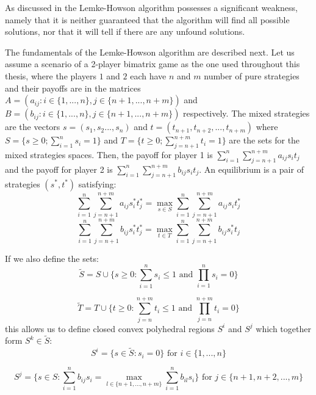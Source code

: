 As discussed in \citet{shapley1974note} the Lemke-Howson algorithm possesses a significant weakness, namely that it is neither guaranteed that the algorithm will find all possible solutions, nor that it will tell if there are any unfound solutions.

The fundamentals of the Lemke-Howson algorithm are described next. Let us assume a scenario of a 2-player bimatrix game as the one used throughout this thesis, where the players $1$ and $2$ each have $n$ and $m$ number of pure strategies and their payoffs are in the matrices $A = (a_{ij}: i \in \{1,...,n\}, j \in \{ n+1,...,n+m\})$ and $B = (b_{ij}: i \in \{1,...,n\}, j \in \{n+1,...,n+m\})$ respectively. The mixed strategies are the vectors $s=(s_1,s_2...,s_n)$ and $t=(t_{n+1},t_{n+2},...,t_{n+m})$ where $S = \{s \geq 0; \sum_{i=1}^{n}s_i = 1\}$ and $T = \{t \geq 0; \sum_{j=n+1}^{n+m}t_i = 1\}$ are the sets for the mixed strategies spaces. Then, the payoff for player 1 is $\sum_{i=1}^{n}\sum_{j=n+1}^{n+m} a_{ij} s_i t_j$ and the payoff for player 2 is $\sum_{i=1}^{n} \sum_{j=n+1}^{n+m} b_{ij} s_i t_j$. An equilibrium is a pair of strategies $(s^*,t^*)$ satisfying:
\begin{equation}
\sum_{i=1}^{n} \sum_{j=n+1}^{n+m} a_{ij}s_i^*t_j^* = \max_{s \in S} \sum_{i=1}^{n} \sum_{j=n+1}^{n+m} a_{ij}s_i t_j^*
\end{equation}
\begin{equation}
\sum_{i=1}^{n} \sum_{j=n+1}^{n+m} b_{ij}s_i^*t_j^* = \max_{t \in T} \sum_{i=1}^{n} \sum_{j=n+1}^{n+m} b_{ij}s_i^* t_j
\end{equation}


If we also define the sets:
\begin{equation}
\tilde{S} =  S \cup \{ s \geq 0: \sum_{i=1}^{n} s_i \leq 1 \text{ and } \prod_{i=1}^{n} s_i = 0 \}
\end{equation}

\begin{equation}
\tilde{T} = T \cup \{t \geq 0: \sum_{j=n}^{n+m} t_i \leq 1 \text{ and } \prod_{j=n}^{n+m} t_i = 0 \}
\end{equation}
this allows us to define closed convex polyhedral regions $S^i$ and $S^j$ which together form $S^k \in \tilde{S}$:
\begin{equation}
S^i = \{ s \in \tilde{S}: s_i = 0 \} \text{ for } i \in \{1,...,n\}
\end{equation}


\begin{equation}
S^j = \{ s \in S: \sum_{i=1}^{n} b_{ij} s_i = \max_{l \in \{n+1,...,n+m\}} \sum_{i=1}^{n} b_{il} s_i \} \text{ for } j \in \{n+1,n+2,...,m\}
\end{equation}


